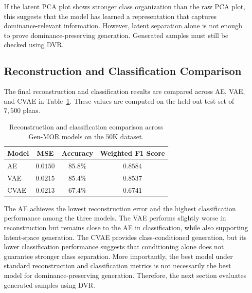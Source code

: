 If the latent PCA plot shows stronger class organization than the raw PCA plot, this suggests that the model has learned a representation that captures dominance-relevant information. However, latent separation alone is not enough to prove dominance-preserving generation. Generated samples must still be checked using DVR.

\subsection{Reconstruction and Classification Comparison}
\label{subsec:reconstruction_classification_comparison}

The final reconstruction and classification results are compared across AE, VAE, and CVAE in Table~\ref{tab:model_performance_comparison}. These values are computed on the held-out test set of $7{,}500$ plans.

\begin{table}[H]
\centering
\caption{Reconstruction and classification comparison across Gen-MOR models on the 50K dataset.}
\label{tab:model_performance_comparison}
\begin{tabular}{|l|c|c|c|}
\hline
\textbf{Model} & \textbf{MSE} & \textbf{Accuracy} & \textbf{Weighted F1 Score} \\
\hline
AE & $0.0150$ & $85.8\%$ & $0.8584$ \\
VAE & $0.0215$ & $85.4\%$ & $0.8537$ \\
CVAE & $0.0213$ & $67.4\%$ & $0.6741$ \\
\hline
\end{tabular}
\end{table}

The AE achieves the lowest reconstruction error and the highest classification performance among the three models. The VAE performs slightly worse in reconstruction but remains close to the AE in classification, while also supporting latent-space generation. The CVAE provides class-conditioned generation, but its lower classification performance suggests that conditioning alone does not guarantee stronger class separation. More importantly, the best model under standard reconstruction and classification metrics is not necessarily the best model for dominance-preserving generation. Therefore, the next section evaluates generated samples using DVR.
